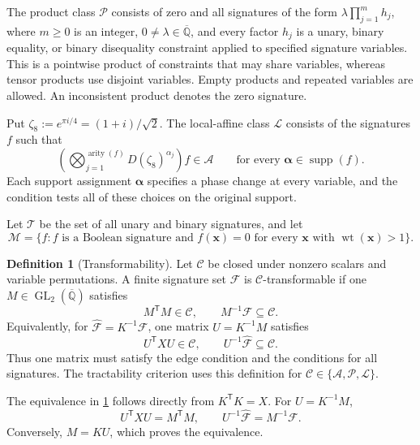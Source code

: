 \documentclass[11pt,letterpaper,onecolumn]{article}
\theoremstyle{plain}
\theoremstyle{definition}
\newtheorem{definition}[definition]{Definition}
\theoremstyle{remark}
\newcommand{\AlgNums}{\overline{\mathbb Q}}
\newcommand{\cF}{\mathcal F}
\newcommand{\cA}{\mathscr A}
\newcommand{\cP}{\mathscr P}
\newcommand{\cL}{\mathscr L}
\newcommand{\cM}{\mathscr M}
\newcommand{\cT}{\mathscr T}
\newcommand{\cC}{\mathscr C}
\newcommand{\GL}{\operatorname{GL}}
\newcommand{\wt}{\operatorname{wt}}
\newcommand{\supp}{\operatorname{supp}}
\newcommand{\arity}{\operatorname{arity}}
\begin{document}
	The product class \(\cP\) consists of zero and all signatures of the form
	\(\lambda\prod_{j=1}^m h_j\), where \(m\ge0\) is an integer,
	\(0\ne\lambda\in\AlgNums\), and every factor
	\(h_j\) is a unary, binary equality, or binary disequality constraint applied
	to specified signature variables.  This is a pointwise product of
	constraints that may share variables, whereas tensor products use disjoint
	variables.  Empty products and repeated variables are allowed. An inconsistent
	product denotes the zero signature.
	
	Put \(\zeta_8:=e^{\pi i/4}=(1+i)/\sqrt2\).
	The local-affine class \(\cL\) consists of the signatures \(f\) such that
	\begin{equation*}
		\left(\bigotimes_{j=1}^{\arity(f)}D(\zeta_8)^{\alpha_j}\right)f\in\cA
		\qquad\text{for every }{\boldsymbol{\alpha}}\in\supp(f).
	\end{equation*}
	Each support assignment \({\boldsymbol{\alpha}}\) specifies a phase change at every
	variable, and the condition tests all of these choices on the original support.
	
	Let \(\cT\) be the set of all unary and binary signatures, and let
	\begin{equation*}
		\cM=\{f:\text{\(f\) is a Boolean signature and }
		f({\mathbf x})=0\text{ for every \({\mathbf x}\) with }\wt({\mathbf x})>1\}.
	\end{equation*}
	


	\begin{definition}[Transformability]
		\label{def:common-transformability}
		\label{def:common-K-presentation}
		Let \(\cC\) be closed under nonzero scalars and variable permutations.  A
		finite signature set \(\cF\) is \(\cC\)-transformable if one
		\(M\in\GL_2(\AlgNums)\) satisfies
		\begin{equation*}
			M^{\mathsf T}M\in\cC,\qquad M^{-1}\cF\subseteq\cC.
		\end{equation*}
		Equivalently, for \(\widehat{\cF}=K^{-1}\cF\), one matrix
		\(U=K^{-1}M\) satisfies
		\begin{equation*}
			U^{\mathsf T}XU\in\cC,\qquad U^{-1}\widehat{\cF}\subseteq\cC.
		\end{equation*}
		Thus one matrix must satisfy the edge condition and the conditions for
		all signatures.  The tractability criterion uses this definition for \(\cC\in\{\cA,\cP,\cL\}\).
	\end{definition}

The equivalence in \cref{def:common-transformability} follows directly
from \(K^{\mathsf T}K=X\).  For \(U=K^{-1}M\),
\[
U^{\mathsf T}XU=M^{\mathsf T}M,
\qquad U^{-1}\widehat{\cF}=M^{-1}\cF.
\]
Conversely, \(M=KU\), which proves the equivalence.
\end{document}
